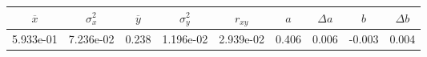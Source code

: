 \begin{tabular}{ccccccccc}
\toprule
$\overline{x}$ & $\sigma_x^2$ & $\overline{y}$ & $\sigma_y^2$ & $r_{xy}$ & $a$ & $\Delta a$ & $b$ & $\Delta b$ \\
\midrule
5.933e-01 & 7.236e-02 & 0.238 & 1.196e-02 & 2.939e-02 & 0.406 & 0.006 & -0.003 & 0.004 \\
\bottomrule
\end{tabular}
